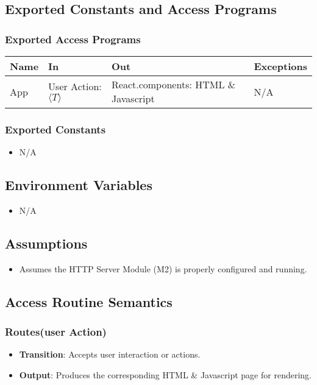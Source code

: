 \documentclass[12pt, titlepage]{article}
\begin{document}
\subsection{Exported Constants and Access Programs}
\subsubsection{Exported Access Programs}

\begin{tabular}{|l|l|l|l|}
    \hline
    \textbf{Name} & \textbf{In} & \textbf{Out} & \textbf{Exceptions} \\
    \hline
    App & User Action: $\langle T \rangle$ & React.components: HTML \& Javascript & N/A \\
    \hline
\end{tabular}

\subsubsection{Exported Constants}
\begin{itemize}
    \item N/A
\end{itemize}
\subsection{Environment Variables}
\begin{itemize}
  \item N/A
\end{itemize}
\subsection{Assumptions}
\begin{itemize}
  \item Assumes the HTTP Server Module (M2) is properly configured and running.
\end{itemize}
\subsection{Access Routine Semantics}
\subsubsection{Routes(user Action)}
\begin{itemize}
  \item \textbf{Transition}: Accepts user interaction or actions.
  \item \textbf{Output}: Produces the corresponding HTML \& Javascript page for rendering.
\end{itemize}
\end{document}
